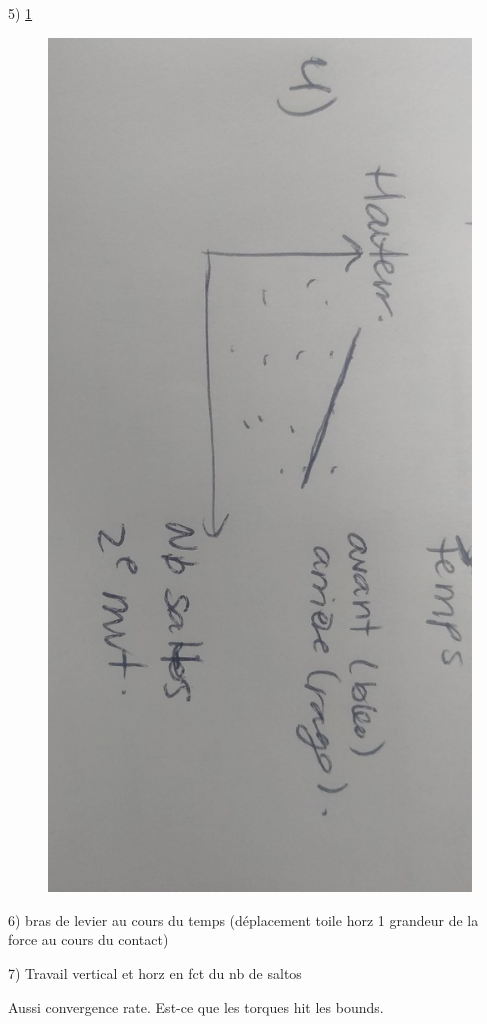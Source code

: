 5) \ref{fig:fig3}
\begin{figure}[h!]
\centering
\includegraphics[width=0.5\linewidth, angle =90]{figures/ALaMain_3.jpg}
\label{fig:fig3}
\end{figure}

6) bras de levier au cours du temps (déplacement toile horz 1 grandeur de la force au cours du contact)

7) Travail vertical et horz en fct du nb de saltos

Aussi
convergence rate.
Est-ce que les torques hit les bounds.

